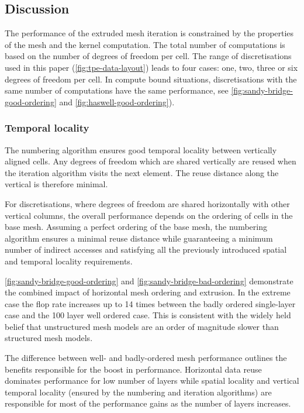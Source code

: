 \documentclass[11pt, a4paper]{scrartcl}
\begin{document}
\subsection{Discussion}
\label{ssec:discussion}

The performance of the extruded mesh iteration is constrained by the
properties of the mesh and the kernel computation.  The total number
of computations is based on the number of degrees of freedom per
cell. The range of discretisations used in this paper
(\autoref{fig:tpe-data-layout}) leads to four cases: one, two, three
or six degrees of freedom per cell. In compute bound situations,
discretisations with the same number of computations have the same
performance, see \autoref{fig:sandy-bridge-good-ordering} and
\autoref{fig:haswell-good-ordering}).

\subsubsection{Temporal locality}
\label{sssec:temporal-locality}
The numbering algorithm ensures good temporal locality between
vertically aligned cells. Any degrees of freedom which are shared
vertically are reused when the iteration algorithm visits the next
element. The reuse distance along the vertical is therefore minimal.

For  discretisations, where degrees of freedom are shared
horizontally with other vertical columns, the overall performance
depends on the ordering of cells in the base mesh. Assuming a perfect
ordering of the base mesh, the numbering algorithm ensures a minimal
reuse distance while guaranteeing a minimum number of indirect
accesses and satisfying all the previously introduced spatial and
temporal locality requirements.

\autoref{fig:sandy-bridge-good-ordering} and
\autoref{fig:sandy-bridge-bad-ordering} demonstrate the combined
impact of horizontal mesh ordering and extrusion. In the extreme case
the flop rate increases up to 14 times between the badly ordered
single-layer case and the 100 layer well ordered case. This is
consistent with the widely held belief that unstructured mesh models
are an order of magnitude slower than structured mesh models.

The difference between well- and badly-ordered mesh performance
outlines the benefits responsible for the boost in
performance. Horizontal data reuse dominates performance for low
number of layers while spatial locality and vertical temporal locality
(ensured by the numbering and iteration algorithms) are responsible
for most of the performance gains as the number of layers increases.
\end{document}
